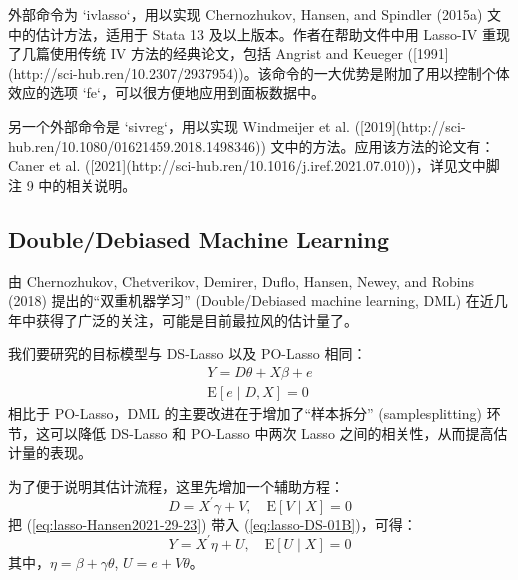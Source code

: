 {外部命令为 `ivlasso`，用以实现  Chernozhukov, Hansen, and Spindler (2015a) 文中的估计方法，适用于 Stata 13 及以上版本。作者在帮助文件中用 Lasso-IV 重现了几篇使用传统 IV 方法的经典论文，包括 Angrist and Keueger ([1991](http://sci-hub.ren/10.2307/2937954))。该命令的一大优势是附加了用以控制个体效应的选项 `fe`，可以很方便地应用到面板数据中。 

另一个外部命令是 `sivreg`，用以实现 Windmeijer et al. ([2019](http://sci-hub.ren/10.1080/01621459.2018.1498346)) 文中的方法。应用该方法的论文有：Caner et al. ([2021](http://sci-hub.ren/10.1016/j.iref.2021.07.010))，详见文中脚注 9 中的相关说明。

\subsection{Double/Debiased Machine Learning}\label{sec:lasso-DML}
由 Chernozhukov, Chetverikov, Demirer, Duflo, Hansen, Newey, and Robins (2018) 提出的“双重机器学习” (Double/Debiased machine learning, DML) 在近几年中获得了广泛的关注，可能是目前最拉风的估计量了。%

我们要研究的目标模型与 DS-Lasso 以及 PO-Lasso 相同：
\begin{equation}\label{eq:lasso-DS-01B}
\begin{aligned}%
Y = D \theta + X \beta + e \\
\mathrm{E}[e \mid D, X] =0
\end{aligned}
\end{equation}
相比于 PO-Lasso，DML 的主要改进在于增加了“样本拆分” (samplesplitting) 环节，这可以降低 DS-Lasso 和 PO-Lasso 中两次 Lasso 之间的相关性，从而提高估计量的表现。

为了便于说明其估计流程，这里先增加一个辅助方程：
\begin{equation}\label{eq:lasso-Hansen2021-29-23}
D=X^{\prime} \gamma+V, \quad \mathrm{E}[V \mid X]=0
\end{equation}
把 (\ref{eq:lasso-Hansen2021-29-23}) 带入 (\ref{eq:lasso-DS-01B})，可得：
\begin{equation}\label{eq:lasso-Hansen2021-29-24}
Y=X^{\prime} \eta+U, \quad \mathrm{E}[U \mid X]=0
\end{equation}
其中，$\eta=\beta+\gamma \theta$, $U=e+V \theta$。

}
